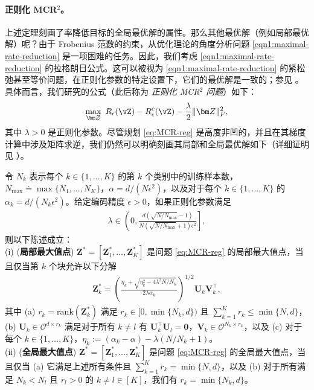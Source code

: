 \documentclass[../../book-main_zh.tex]{subfiles}
\begin{document}
\paragraph{正则化 MCR$^2$。}
上述定理刻画了率降低目标的全局最优解的属性。那么其他最优解（例如局部最优解）呢？由于 Frobenius 范数的约束，从优化理论的角度分析问题 \eqref{eqn1:maximal-rate-reduction} 是一项困难的任务。因此，我们考虑 \eqref{eqn1:maximal-rate-reduction} 的拉格朗日公式。这可以被视为 \eqref{eqn1:maximal-rate-reduction} 的紧松弛甚至等价问题，在正则化参数的特定设置下，它们的最优解是一致的；参见 \cite[Proposition 3.2]{wang2024global}。具体而言，我们研究的公式（此后称为 \textit{正则化 MCR$^2$ 问题}）如下：
\begin{align}\label{eq:MCR-reg}
    \max_{\bm Z}\ R_{\epsilon}(\vZ) - R_{\epsilon}^c(\vZ) -
    \frac{\lambda}{2}\|\bm Z\|_F^2,
\end{align}
其中 $\lambda > 0$ 是正则化参数。尽管规划 \eqref{eq:MCR-reg} 是高度非凹的，并且在其梯度计算中涉及矩阵求逆，我们仍然可以明确刻画其局部和全局最优解如下（详细证明见 \cite[Theorem 3.1]{wang2024global}）。

\begin{theorem}[\bf 局部和全局最优解]\label{thm:mcr-global-opt}
    令 $N_k$ 表示每个 $k \in \{1,\dots,K\}$ 的第 $k$ 个类别中的训练样本数，$N_{\max} \doteq \max\{N_1,\dots,N_K\}$，$\alpha=d/(N\epsilon^2)$，以及对于每个 $k \in \{1,\dots,K\}$ 的 $\alpha_{k} = d/(N_k\epsilon^2)$。给定编码精度 $\epsilon > 0$，如果正则化参数满足
    \begin{align}\label{eq:lambda}
        \lambda \in \left(0,
            \frac{d(\sqrt{N/N_{\max}}-1)}{N(\sqrt{N/N_{\max}}+1)\epsilon^2}
        \right],
    \end{align}
    则以下陈述成立：\\
    (i) ({\bf 局部最大值点}) $\bm Z^* = \left[\bm Z_1^*,\dots,\bm Z_K^* \right]$ 是问题 \eqref{eq:MCR-reg} 的局部最大值点，当且仅当第 $k$ 个块允许以下分解
    \begin{align}\label{eq:Zk opti}
        \bm Z_k^* = \left(\frac{ \eta_k + \sqrt{\eta_k^2 -
        4\lambda^2N/N_k}}{2\lambda \alpha_{k}}\right)^{1/2} \bm
        U_k \bm V_k^\top,
    \end{align}
    其中 (a) $r_k = \mathrm{rank}(\bm Z_k^*)$ 满足 $r_k \in [0,\min\{N_k,d\})$ 且 $\sum_{k=1}^K r_k \le \min\{N,d\}$，(b) $\bm U_k \in \mathcal{O}^{d \times r_k}$ 满足对于所有 $k \neq l$ 有 $\bm U_k^{\top}\bm U_l = \bm 0$，$\bm V_k \in \mathcal{O}^{N_k \times r_k}$，以及 (c) 对于每个 $k\in \{1,\dots,K\}$，$\eta_k := (\alpha_k-\alpha) - \lambda(N/N_k+1)$。
    \\
    (ii) ({\bf 全局最大值点}) $\bm Z^* = \left[\bm Z_1^*,\dots,\bm Z_K^* \right]$ 是问题 \eqref{eq:MCR-reg} 的全局最大值点，当且仅当 (a) 它满足上述所有条件且 $\sum_{k=1}^K r_k = \min\{N,d\}$，以及 (b) 对于所有满足 $N_k < N_l$ 且 $r_l > 0$ 的 $k \neq l \in [K]$，我们有 $r_k = \min\{N_k,d\}$。
\end{theorem}
\end{document}
